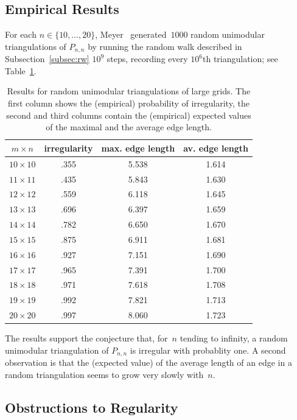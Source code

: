 \subsection{Empirical Results}

For each $n\in\{10,\dots,20\}$, Meyer~\cite{Meyer} generated~$1000$
random unimodular triangulations of $P_{n,n}$ by running the random
walk described in Subsection~\ref{subsec:rw} $10^9$ steps, recording
every $10^6$th triangulation; see Table~\ref{tab:large}.
\begin{table}[ht]
  \centering
  \begin{tabular}{cccc}
    \hline
    $m\times n$ &
    \multicolumn{1}{c}{irregularity} & 
    \multicolumn{1}{c}{max. edge length} & 
    \multicolumn{1}{c}{av. edge length} \\
    \hline
    $10\times 10$ & .355 & 5.538 & 1.614 \\
    $11\times 11$ & .435 & 5.843 & 1.630 \\
    $12\times 12$ & .559 & 6.118 & 1.645 \\
    $13\times 13$ & .696 & 6.397 & 1.659 \\
    $14\times 14$ & .782 & 6.650 & 1.670 \\
    $15\times 15$ & .875 & 6.911 & 1.681 \\
    $16\times 16$ & .927 & 7.151 & 1.690 \\
    $17\times 17$ & .965 & 7.391 & 1.700 \\
    $18\times 18$ & .971 & 7.618 & 1.708 \\
    $19\times 19$ & .992 & 7.821 & 1.713 \\
    $20\times 20$ & .997 & 8.060 & 1.723 \\
    \hline
  \end{tabular}
  \caption{Results for random unimodular triangulations of large grids. The first
  column shows the (empirical) probability of irregularity, the
  second and third columns contain the (empirical) expected values of
  the maximal and the average edge length.}
  \label{tab:large}
\end{table}

The results  support the conjecture that, for~$n$ tending to
infinity, a random unimodular triangulation of $P_{n,n}$ is irregular
with probablity one. A second observation is that the (expected value)
of the average length of an edge in a random triangulation seems to
grow very slowly with~$n$. 

\subsection{Obstructions to Regularity}

